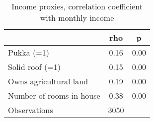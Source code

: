 \begin{table}[htbp]\centering
\def\sym#1{\ifmmode^{#1}\else\(^{#1}\)\fi}
\caption{Income proxies, correlation coefficient with monthly income}
\begin{tabular}{l*{1}{cc}}
\toprule
                    &         rho&           p\\
\midrule
Pukka (=1)          &        0.16&        0.00\\
Solid roof (=1)     &        0.15&        0.00\\
Owns agricultural land&        0.19&        0.00\\
Number of rooms in house&        0.38&        0.00\\
\midrule
Observations        &        3050&            \\
\bottomrule
\end{tabular}
\end{table}
